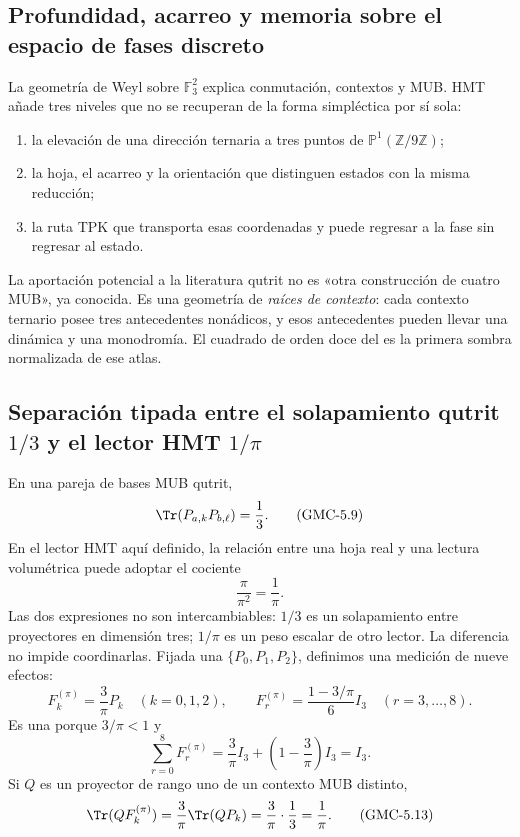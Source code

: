 \subsection{Profundidad, acarreo y memoria sobre el espacio de fases discreto}

La geometría de Weyl sobre $\mathbb F_3^2$ explica conmutación, contextos y
MUB. HMT añade tres niveles que no se recuperan de la forma simpléctica por
sí sola:

\begin{enumerate}
 \item la elevación de una dirección ternaria a tres puntos de
 $\mathbb P^1(\mathbb Z/9\mathbb Z)$;
 \item la hoja, el acarreo y la orientación que distinguen estados con la
 misma reducción;
 \item la ruta TPK que transporta esas coordenadas y puede regresar a la
 fase sin regresar al estado.
\end{enumerate}

La aportación potencial a la literatura qutrit no es «otra construcción de
cuatro MUB», ya conocida. Es una geometría de \emph{raíces de contexto}: cada
contexto ternario posee tres antecedentes nonádicos, y esos antecedentes
pueden llevar una dinámica y una monodromía. El cuadrado de orden doce del
 es la primera sombra normalizada de ese atlas.

\subsection{Separación tipada entre el solapamiento qutrit
\texorpdfstring{$1/3$}{1/3} y el lector HMT
\texorpdfstring{$1/\pi$}{1/pi}}

En una pareja de bases MUB qutrit,
\[
 \Tr(P_{a,k}P_{b,\ell})=\frac13.
 \tag{GMC-5.9}
\]
En el lector HMT aquí definido, la relación entre una hoja real y una
lectura volumétrica puede adoptar el cociente
\[
 \frac{\pi}{\pi^2}=\frac1\pi.
 \tag{GMC-5.10}
\]
Las dos expresiones no son intercambiables: $1/3$ es un solapamiento entre
proyectores en dimensión tres; $1/\pi$ es un peso escalar de otro lector.
La diferencia no impide coordinarlas. Fijada una \PVM
$\{P_0,P_1,P_2\}$, definimos una medición de nueve efectos:
\[
 F_k^{(\pi)}=\frac3\pi P_k\quad(k=0,1,2),
 \qquad
 F_r^{(\pi)}=\frac{1-3/\pi}{6}I_3\quad(r=3,\ldots,8).
 \tag{GMC-5.11}
\]
Es una \POVM porque $3/\pi<1$ y
\[
 \sum_{r=0}^{8}F_r^{(\pi)}
 =\frac3\pi I_3+\left(1-\frac3\pi\right)I_3=I_3.
 \tag{GMC-5.12}
\]
Si $Q$ es un proyector de rango uno de un contexto MUB distinto,
\[
 \Tr(QF_k^{(\pi)})
 =\frac3\pi\Tr(QP_k)
 =\frac3\pi\cdot\frac13
 =\frac1\pi.
 \tag{GMC-5.13}
\]

